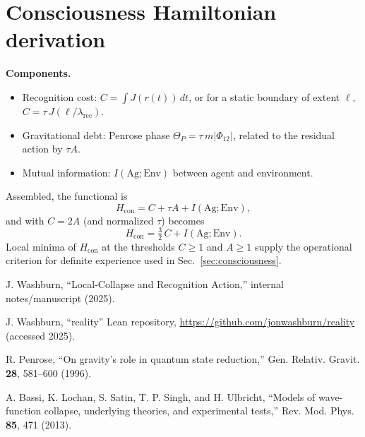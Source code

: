 \documentclass[reprint,aps,prd,nofootinbib]{revtex4-2}
\begin{document}
\section{Consciousness Hamiltonian derivation}
\noindent\textbf{Components.}
\begin{itemize}
  \item Recognition cost: $C=\int J(r(t))\,dt$, or for a static boundary of extent $\ell$, $C=\tau\,J(\ell/\lambda_{\mathrm{rec}})$.
  \item Gravitational debt: Penrose phase $\Theta_P=\tau\,m|\Phi_{12}|$, related to the residual action by $\tau A$.
  \item Mutual information: $I(\mathrm{Ag};\mathrm{Env})$ between agent and environment.
\end{itemize}
Assembled, the functional is
\begin{equation}
  H_{\mathrm{con}}=C+\tau A+I(\mathrm{Ag};\mathrm{Env}),
\end{equation}
and with $C=2A$ (and normalized $\tau$) becomes
\begin{equation}
  H_{\mathrm{con}}=\tfrac{3}{2}\,C + I(\mathrm{Ag};\mathrm{Env}).
\end{equation}
Local minima of $H_{\mathrm{con}}$ at the thresholds $C\ge 1$ and $A\ge 1$ supply the operational criterion for definite experience used in Sec.~\ref{sec:consciousness}.

\begin{thebibliography}{99}

J. Washburn, ``Local-Collapse and Recognition Action,'' internal notes/manuscript (2025).

J. Washburn, ``reality'' Lean repository, \url{https://github.com/jonwashburn/reality} (accessed 2025).

R. Penrose, ``On gravity's role in quantum state reduction,'' Gen. Relativ. Gravit. \textbf{28}, 581--600 (1996).

A. Bassi, K. Lochan, S. Satin, T. P. Singh, and H. Ulbricht, ``Models of wave-function collapse, underlying theories, and experimental tests,'' Rev. Mod. Phys. \textbf{85}, 471 (2013).

\end{thebibliography}
\end{document}
